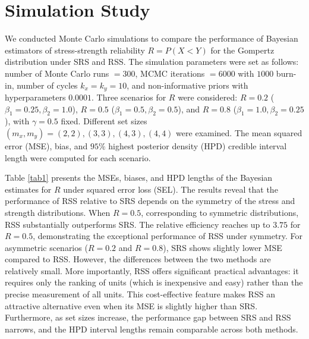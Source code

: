 \documentclass[twoside]{article}
\begin{document}
\section{Simulation Study}\label{sec4}
We conducted Monte Carlo simulations to compare the performance of Bayesian estimators of stress-strength reliability \(R = P(X<Y)\) for the Gompertz distribution under SRS and RSS. The simulation parameters were set as follows: number of Monte Carlo runs \(= 300\), MCMC iterations \(= 6000\) with \(1000\) burn-in, number of cycles \(k_x = k_y = 10\), and non-informative priors with hyperparameters \(0.0001\). Three scenarios for \(R\) were considered: \(R = 0.2\) (\(\beta_1 = 0.25, \beta_2 = 1.0\)), \(R = 0.5\) (\(\beta_1 = 0.5, \beta_2 = 0.5\)), and \(R = 0.8\) (\(\beta_1 = 1.0, \beta_2 = 0.25\)), with \(\gamma = 0.5\) fixed. Different set sizes \((m_x, m_y) = (2,2), (3,3), (4,3), (4,4)\) were examined. The mean squared error (MSE), bias, and \(95\%\) highest posterior density (HPD) credible interval length were computed for each scenario.

Table \ref{tab1} presents the MSEs, biases, and HPD lengths of the Bayesian estimates for \(R\) under squared error loss (SEL). The results reveal that the performance of RSS relative to SRS depends on the symmetry of the stress and strength distributions. When \(R = 0.5\), corresponding to symmetric distributions, RSS substantially outperforms SRS. The relative efficiency reaches up to \(3.75\) for \(R = 0.5\), demonstrating the exceptional performance of RSS under symmetry.
For asymmetric scenarios (\(R = 0.2\) and \(R = 0.8\)), SRS shows slightly lower MSE compared to RSS. However, the differences between the two methods are relatively small. %
More importantly, RSS offers significant practical advantages: it requires only the ranking of units (which is inexpensive and easy) rather than the precise measurement of all units. This cost-effective feature makes RSS an attractive alternative even when its MSE is slightly higher than SRS. Furthermore, as set sizes increase, the performance gap between SRS and RSS narrows, and the HPD interval lengths remain comparable across both methods.
\end{document}
